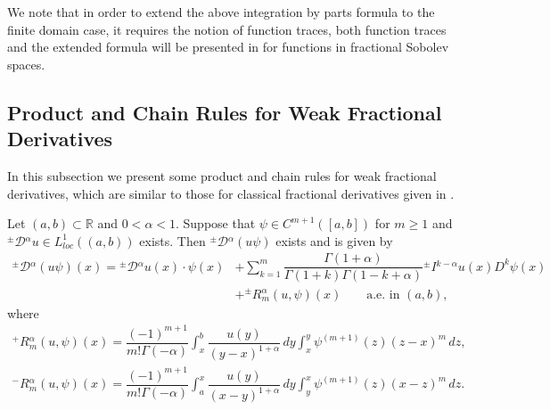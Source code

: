 \documentclass[leqno,final]{siamltex}
\numberwithin{equation}{section}
\renewcommand{\(}{\bigl(}
\renewcommand{\)}{\bigr)}
\newcommand{\R}{\mathbb{R}}
\begin{document}
We note that in order to extend the above integration by parts  formula to the finite domain case, 
	it requires the notion of function traces, both function traces and the extended 
	formula will 
	be presented in \cite{Feng_Sutton1a} for functions in fractional Sobolev spaces.

   
    \subsection{Product and Chain Rules for Weak Fractional Derivatives}\label{sec-4.5}
    In this subsection we present some product and chain rules for weak fractional derivatives, which are
    similar to those for classical fractional derivatives given in \cite[Section 2.5]{Feng_Sutton}.
     

\begin{theorem}\label{WeakProductRule}
    Let $(a,b) \subset \R$ and $0<\alpha <1$.  Suppose that $\psi \in C^{m+1}([a,b])$ for $m \geq 1$ and ${^{\pm}}{\mathcal{D}}{^{\alpha}} u\in L^1_{loc}((a,b))$ exists. Then  ${^{\pm}}{\mathcal{D}}{^{\alpha}} (u \psi)$ 
    exists and is given by 
    \begin{align*}
        {^{\pm}}{\mathcal{D}}{^{\alpha}} (u \psi)(x) = {^{\pm}}{\mathcal{D}}{^{\alpha}} u(x) \cdot \psi(x) &+ \sum_{k=1}^{m} \dfrac{\Gamma(1 + \alpha)}{\Gamma(1+ k)\Gamma(1 - k + \alpha)} {^{\pm}}{I}{^{k-\alpha}} u(x) D^{k} \psi(x) \\
        &+ {^{\pm}}{R}{^{\alpha}_{m}}(u, \psi)(x) \qquad \mbox{a.e. in } (a,b),
    \end{align*}
    where 
    \begin{align*}
        {^{+}}{R}{^{\alpha}_{m}} (u,\psi)(x) = \dfrac{(-1)^{m+1}}{m! \Gamma(-\alpha)} \int_{x}^{b} \dfrac{u(y)}{(y -x )^{1 + \alpha}} \, dy \int_{x}^{y} \psi^{(m+1)} (z) (z - x)^{m} \, dz,\\
        {^{-}}{R}{^{\alpha}_{m}}(u,\psi)(x) = \dfrac{(-1)^{m+1}}{m! \Gamma(-\alpha)} \int_{a}^{x} \dfrac{u(y)}{(x-y)^{1 + \alpha}} \, dy \int_{y}^{x} \psi^{(m+1)}(z) (x -z)^{m} \, dz.
    \end{align*}
\end{theorem}
\end{document}
